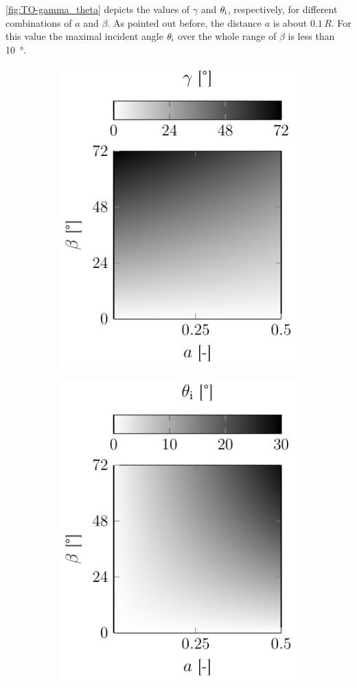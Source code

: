 \cref{fig:TO-gamma_theta} depicts the values of $\gamma$ and $\theta_{\mathrm{i}}$, 
respectively, for different combinations of $a$ and $\beta$. As pointed out 
before, the distance $a$ is about $0.1\,R$. For this value the maximal incident 
angle $\theta_{\mathrm{i}}$ over the whole range of $\beta$ is less than 
\SI{10}{\degree}.

\begin{figure}
  \centering
  \begin{subfigure}[b]{0.45\textwidth}
    \centering
    \caption{}
    \includegraphics[]{Plots/cache/gamma.pdf}
    \label{fig:TO-gamma}
  \end{subfigure}
  \hfill
  \begin{subfigure}[b]{0.45\textwidth}
    \centering
    \caption{}
    \includegraphics[]{Plots/cache/theta_i.pdf}

\end{subfigure}
\end{figure}
